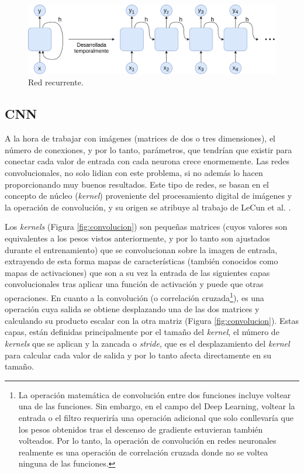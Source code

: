 \begin{figure}[H]
\centering
\includegraphics[width=0.8\linewidth]{imagenes/rnn.png} 
\captionsetup{width=.8\linewidth}
\caption{Red recurrente.}
\label{fig:rnn}
\end{figure}

\subsection{CNN}
A la hora de trabajar con imágenes (matrices de dos o tres dimensiones), el número de conexiones, y por lo tanto, parámetros, que tendrían que existir para conectar cada valor de entrada con cada neurona crece enormemente. Las redes convolucionales, no solo lidian con este problema, si no además lo hacen proporcionando muy buenos resultados. Este tipo de redes, se basan en el concepto de núcleo (\textit{kernel}) proveniente del procesamiento digital de imágenes y la operación de convolución, y su origen se atribuye al trabajo de LeCun et al. \cite{}.

Los \textit{kernels} (Figura \ref{fig:convolucion}) son pequeñas matrices (cuyos valores son equivalentes a los pesos vistos anteriormente, y por lo tanto son ajustados durante el entrenamiento) que se convolucionan sobre la imagen de entrada, extrayendo de esta forma mapas de características (también conocidos como mapas de activaciones) que son a su vez la entrada de las siguientes capas convolucionales tras aplicar una función de activación y puede que otras operaciones. En cuanto a la convolución (o correlación cruzada\footnote{La operación matemática de convolución entre dos funciones incluye voltear una de las funciones. Sin embargo, en el campo del Deep Learning, voltear la entrada o el filtro requeriría una operación adicional que solo conllevaría que los pesos obtenidos tras el descenso de gradiente estuvieran también volteados. Por lo tanto, la operación de convolución en redes neuronales realmente es una operación de correlación cruzada donde no se voltea ninguna de las funciones.}), es una operación cuya salida se obtiene desplazando una de las dos matrices y calculando su producto escalar con la otra matriz (Figura \ref{fig:convolucion}). Estas capas, están definidas principalmente por el tamaño del \textit{kernel}, el número de \textit{kernels} que se aplican y la zancada o \textit{stride}, que es el desplazamiento del \textit{kernel} para calcular cada valor de salida y por lo tanto afecta directamente en su tamaño. 

